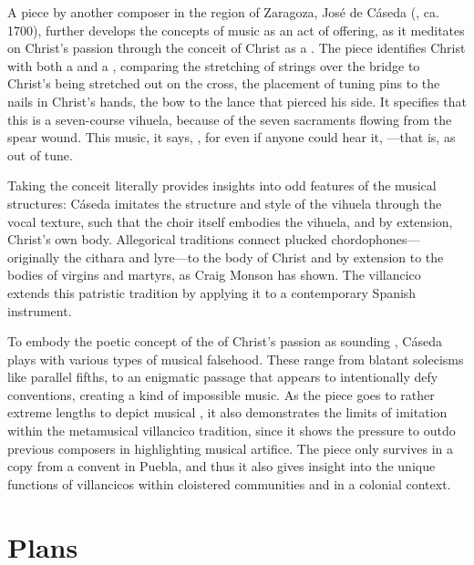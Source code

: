 \documentclass{vcbook-proposal}
\begin{document}

A piece by another composer in the region of Zaragoza, José de Cáseda 
(, ca. 1700), further develops the concepts of 
music as an act of offering, as it meditates on Christ's passion through the 
conceit of Christ as a . 
The piece identifies Christ with both a  and a , 
comparing the stretching of strings over the bridge to Christ's being stretched 
out on the cross, the placement of tuning pins to the nails in Christ's hands, 
the bow to the lance that pierced his side.
It specifies that this is a seven-course vihuela, because of the seven 
sacraments flowing from the spear wound.
This music, it says, , for even if anyone could 
hear it, ---that is, as out of tune. 

Taking the conceit literally provides insights into odd features of the musical 
structures: Cáseda imitates the structure and style of the vihuela through the 
vocal texture, such that the choir itself embodies the vihuela, and by 
extension, Christ's own body.
Allegorical traditions connect plucked chordophones---originally the cithara 
and lyre---to the body of Christ and by extension to the bodies of virgins and 
martyrs, as Craig Monson has shown.%
  \Autocite{Monson:DivasConvent}
The villancico extends this patristic tradition by applying it to a 
contemporary Spanish instrument.

To embody the poetic concept of the  of Christ's passion as 
sounding , Cáseda plays with various types of musical falsehood.
These range from blatant solecisms like parallel fifths, to an enigmatic passage
that appears to intentionally defy  conventions, creating a
kind of impossible music.
As the piece goes to rather extreme lengths to depict musical 
, it also demonstrates the limits of imitation within the 
metamusical villancico tradition, since it shows the pressure to outdo previous 
composers in highlighting musical artifice.
The piece only survives in a copy from a convent in Puebla, and thus it also 
gives insight into the unique functions of villancicos within cloistered 
communities and in a colonial context.

\section{Plans}
\end{document}

